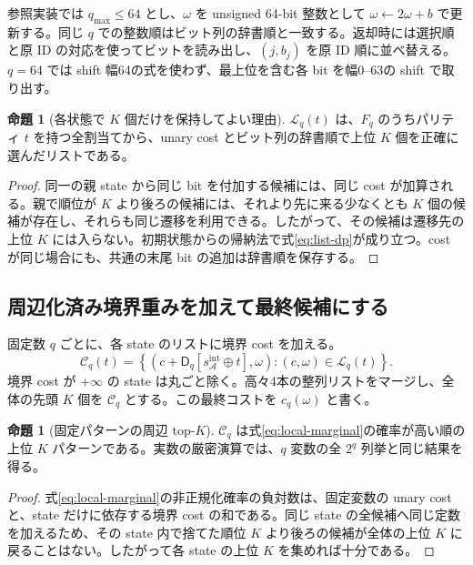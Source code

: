 \documentclass[a4paper,11pt]{ltjsarticle}
\numberwithin{equation}{section}
\theoremstyle{definition}
\newtheorem{proposition}[definition]{命題}
\newcommand{\A}{\mathcal A}
\newcommand{\ninf}{+\infty}
\begin{document}
参照実装では $q_{\max}\le64$ とし、$\omega$ を unsigned 64-bit 整数として $\omega\leftarrow2\omega+b$ で更新する。同じ $q$ での整数順はビット列の辞書順と一致する。返却時には選択順と原 ID の対応を使ってビットを読み出し、$(j,b_j)$ を原 ID 順に並べ替える。$q=64$ では shift 幅64の式を使わず、最上位を含む各 bit を幅0--63の shift で取り出す。

\begin{proposition}[各状態で $K$ 個だけを保持してよい理由]
$\mathcal L_q(t)$ は、$F_q$ のうちパリティ $t$ を持つ全割当てから、unary cost とビット列の辞書順で上位 $K$ 個を正確に選んだリストである。
\end{proposition}
\begin{proof}
同一の親 state から同じ bit を付加する候補には、同じ cost が加算される。親で順位が $K$ より後ろの候補には、それより先に来る少なくとも $K$ 個の候補が存在し、それらも同じ遷移を利用できる。したがって、その候補は遷移先の上位 $K$ には入らない。初期状態からの帰納法で式\eqref{eq:list-dp}が成り立つ。cost が同じ場合にも、共通の末尾 bit の追加は辞書順を保存する。
\end{proof}

\subsection{周辺化済み境界重みを加えて最終候補にする}
固定数 $q$ ごとに、各 state のリストに境界 cost を加える。
\begin{equation}
 \mathcal C_q(t)=
 \left\{\left(c+\mathsf D_q[s_\A^{\mathrm{int}}\oplus t],\omega\right):
                    (c,\omega)\in\mathcal L_q(t)\right\}.
 \label{eq:terminal}
\end{equation}
境界 cost が $\ninf$ の state は丸ごと除く。高々4本の整列リストをマージし、全体の先頭 $K$ 個を $\mathcal C_q$ とする。この最終コストを $c_q(\omega)$ と書く。

\begin{proposition}[固定パターンの周辺 top-$K$]
$\mathcal C_q$ は式\eqref{eq:local-marginal}の確率が高い順の上位 $K$ パターンである。実数の厳密演算では、$q$ 変数の全 $2^q$ 列挙と同じ結果を得る。
\end{proposition}
\begin{proof}
式\eqref{eq:local-marginal}の非正規化確率の負対数は、固定変数の unary cost と、state だけに依存する境界 cost の和である。同じ state の全候補へ同じ定数を加えるため、その state 内で捨てた順位 $K$ より後ろの候補が全体の上位 $K$ に戻ることはない。したがって各 state の上位 $K$ を集めれば十分である。
\end{proof}
\end{document}
